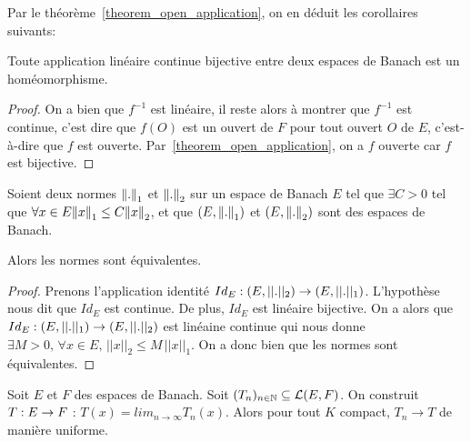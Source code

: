 Par le théorème~\ref{theorem_open_application}, on en déduit les corollaires
suivants:

\begin{corollary}
	Toute application linéaire continue bijective entre deux espaces de Banach
	est un homéomorphisme.
\end{corollary}

\begin{proof}
	On a bien que $f^{-1}$ est linéaire, il reste alors à montrer que $f^{-1}$
	est continue, c'est dire que $f(O)$ est un ouvert de $F$ pour tout ouvert
	$O$ de $E$, c'est-à-dire que $f$ est ouverte.
	Par~\ref{theorem_open_application}, on a $f$ ouverte car $f$ est bijective.
\end{proof}

\begin{corollary}
	Soient deux normes $\norm{.}_{1}$ et $\norm{.}_{2}$ sur un espace de
	Banach $E$ tel que $\exists C > 0$ tel que $\forall x \in E
	\norm{x}_{1} \leq C \norm{x}_{2}$, et que
	$(E, \norm{.}_{1})$ et
	$(E, \norm{.}_{2})$
	sont des espaces de Banach.

	Alors les normes sont équivalentes.
\end{corollary}

\begin{proof}
	Prenons l'application identité $Id_{E} : (E, ||.||_{2}) \rightarrow (E,
	||.||_{1})$. L'hypothèse nous dit que $Id_{E}$ est continue. De plus,
	$Id_{E}$ est linéaire bijective. On a alors que
	$Id_{E} : (E, ||.||_{1}) \rightarrow (E, ||.||_{2})$ est linéaine
	continue qui nous donne $\exists M > 0, \, \forall x \in E, \,
	||x||_{2} \leq M \, ||x||_{1}$. On a donc bien que les normes sont
	équivalentes.
\end{proof}

\begin{corollary}
	Soit $E$ et $F$ des espaces de Banach.
	Soit $(T_{n})_{n \in \mathbb{N}} \subseteq \mathcal{L}(E, F)$. On
	construit $T : E \rightarrow F$ : $T(x) = lim_{n \rightarrow \infty}
	T_{n}(x)$. Alors pour tout $K$ compact, $T_{n} \rightarrow T$ de manière
	uniforme.
\end{corollary}
